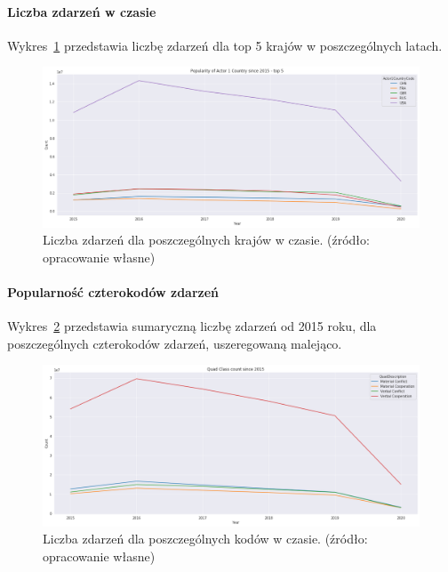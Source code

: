 \documentclass[11pt]{report}
\begin{document}
    \paragraph{Liczba zdarzeń w czasie}
    Wykres~\ref{fig:GLOBALactor1inTime} przedstawia liczbę zdarzeń dla top 5 krajów w poszczególnych latach.
    \begin{figure}[!htp]
        \centering
        \includegraphics[width=\linewidth]{fig/GLOBAL/Actor1inTIME.png}
        \caption{Liczba zdarzeń dla poszczególnych krajów w czasie. (źródło: opracowanie własne)}
        \label{fig:GLOBALactor1inTime}
    \end{figure}

    \paragraph{Popularność czterokodów zdarzeń}
    Wykres~\ref{fig:GLOBALQC} przedstawia sumaryczną liczbę zdarzeń od 2015 roku, dla poszczególnych czterokodów zdarzeń, uszeregowaną malejąco.
    \begin{figure}[!htp]
        \centering
        \includegraphics[width=\linewidth]{fig/GLOBAL/QC.png}
        \caption{Liczba zdarzeń dla poszczególnych kodów w czasie. (źródło: opracowanie własne)}
        \label{fig:GLOBALQC}
    \end{figure}
\end{document}
